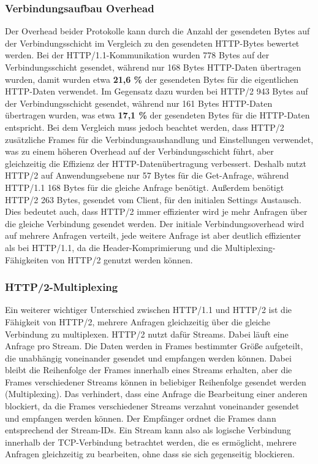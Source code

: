 \subsubsection*{Verbindungsaufbau Overhead}

Der Overhead beider Protokolle kann durch die Anzahl der gesendeten Bytes auf der Verbindungsschicht im Vergleich zu den gesendeten HTTP-Bytes bewertet werden.
Bei der HTTP/1.1-Kommunikation wurden 778 Bytes auf der Verbindungsschicht gesendet, während nur 168 Bytes HTTP-Daten übertragen wurden, damit wurden etwa \textbf{21,6 \%} der gesendeten Bytes für die eigentlichen HTTP-Daten verwendet.
Im Gegensatz dazu wurden bei HTTP/2 943 Bytes auf der Verbindungsschicht gesendet, während nur 161 Bytes HTTP-Daten übertragen wurden, was etwa \textbf{17,1 \%} der gesendeten Bytes für die HTTP-Daten entspricht.
Bei dem Vergleich muss jedoch beachtet werden, dass HTTP/2 zusätzliche Frames für die Verbindungsaushandlung und Einstellungen verwendet, was zu einem höheren Overhead auf der Verbindungsschicht führt, aber gleichzeitig die Effizienz der HTTP-Datenübertragung verbessert.
Deshalb nutzt HTTP/2 auf Anwendungsebene nur 57 Bytes für die Get-Anfrage, während HTTP/1.1 168 Bytes für die gleiche Anfrage benötigt.
Außerdem benötigt HTTP/2 263 Bytes, gesendet vom Client, für den initialen Settings Austausch.
Dies bedeutet auch, dass HTTP/2 immer effizienter wird je mehr Anfragen über die gleiche Verbindung gesendet werden.
Der initiale Verbindungsoverhead wird auf mehrere Anfragen verteilt, jede weitere Anfrage ist aber deutlich effizienter als bei HTTP/1.1, da die Header-Komprimierung und die Multiplexing-Fähigkeiten von HTTP/2 genutzt werden können.

\subsubsection*{HTTP/2-Multiplexing}
Ein weiterer wichtiger Unterschied zwischen HTTP/1.1 und HTTP/2 ist die Fähigkeit von HTTP/2, mehrere Anfragen gleichzeitig über die gleiche Verbindung zu multiplexen.
HTTP/2 nutzt dafür Streams.
Dabei läuft eine Anfrage pro Stream.
Die Daten werden in Frames bestimmter Größe aufgeteilt, die unabhängig voneinander gesendet und empfangen werden können.
Dabei bleibt die Reihenfolge der Frames innerhalb eines Streams erhalten, aber die Frames verschiedener Streams können in beliebiger Reihenfolge gesendet werden (Multiplexing).
Das verhindert, dass eine Anfrage die Bearbeitung einer anderen blockiert, da die Frames verschiedener Streams verzahnt voneinander gesendet und empfangen werden können.
Der Empfänger ordnet die Frames dann entsprechend der Stream-IDs.
Ein Stream kann also als logische Verbindung innerhalb der TCP-Verbindung betrachtet werden, die es ermöglicht, mehrere Anfragen gleichzeitig zu bearbeiten, ohne dass sie sich gegenseitig blockieren.

